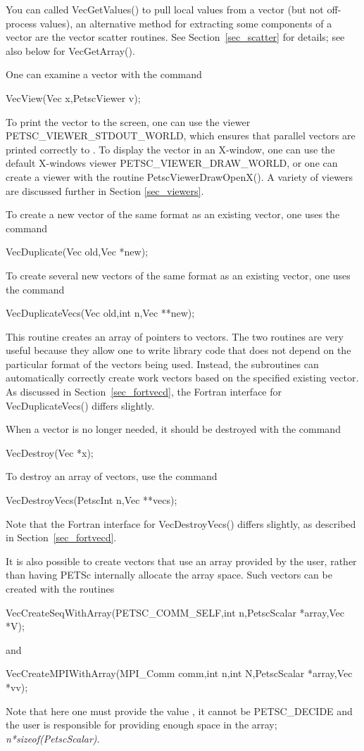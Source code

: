 You can called VecGetValues() to pull local values from a vector (but
not off-process values),
an alternative method for extracting some components of a vector are
the vector scatter routines.  See Section~\ref{sec_scatter} for details; see also
below for VecGetArray().

One can examine a vector with the command
\begin{tabbing}
  VecView(Vec x,PetscViewer v);
\end{tabbing}
To print the vector to the screen, one can use the viewer
PETSC_VIEWER_STDOUT_WORLD,
which ensures that parallel vectors are printed correctly to
. To display the vector in an X-window, one can use the
default X-windows viewer PETSC_VIEWER_DRAW_WORLD,
or one can create a viewer with the
routine PetscViewerDrawOpenX().  A variety of viewers are discussed
further in Section \ref{sec_viewers}.

To create a new vector of the same format as an existing vector, one uses
the command 
\begin{tabbing}
  VecDuplicate(Vec old,Vec *new);
\end{tabbing}
To create several new vectors of the same format as an existing vector,
one uses the command 
\begin{tabbing}
  VecDuplicateVecs(Vec old,int n,Vec **new);
\end{tabbing}
This routine creates an array of pointers to vectors. The two routines 
are very useful because they allow one to write library code that does 
not depend on the particular format of the vectors being used. Instead,
the subroutines can automatically correctly create work vectors
based on the specified existing vector.  As discussed in 
Section~\ref{sec_fortvecd}, the Fortran interface for VecDuplicateVecs()
differs slightly.

When a vector is no longer needed, it should be destroyed with the 
command 
\begin{tabbing}
  VecDestroy(Vec *x);
\end{tabbing}
To destroy an array of vectors, use the command 
\begin{tabbing}
  VecDestroyVecs(PetscInt n,Vec **vecs);
\end{tabbing}
Note that the Fortran interface for VecDestroyVecs() differs slightly,
as described in Section~\ref{sec_fortvecd}.

It is also possible to create vectors that use an array provided by the user, 
rather than having PETSc internally allocate the array space. 
Such vectors can be created with the routines
\begin{tabbing}
  VecCreateSeqWithArray(PETSC_COMM_SELF,int n,PetscScalar *array,Vec *V);
\end{tabbing}
and  
\begin{tabbing}
  VecCreateMPIWithArray(MPI\_Comm comm,int n,int N,PetscScalar *array,Vec *vv);
\end{tabbing}
Note that here one must provide the value , it cannot be PETSC_DECIDE and
the user is responsible for providing enough space in the array; {\em n*sizeof(PetscScalar)}.


